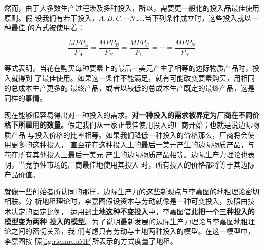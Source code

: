 然而，由于大多数生产过程涉及多种投入，所以，需要更一般化的投入品最佳使用原则。假
设我们有若干投入，$A, B, C , \cdots N$……当下列条件成立时，这些投入就以一种最佳
的方式被使用着：

\[\frac{MPP_A}{P_A} = \frac{MPP_B}{P_B} = \frac{MPP_C}{P_C} = \cdots = \frac{MPP_N}{P_N}\]

等式表明，当花在购买每种要素上的最后一美元产生了相等的边际物质产品时，投入就得到
了最佳使用。如果这一条件不能满足，就有可能改变要素购买，用相同的总成本生产更多的
最终产品，或者以较低的总成本生产既定的最终产品，这是同样的事情。

现在能够很容易得出对一种投入的需求。\textbf{对一种投入的需求被界定为厂商在不同价
  格下所雇用的数量。}假定我们从一家正最佳使用投入的厂商开始；也就是说边际物质产品
与投入价格的比率相等。如果我们降低一种投入的价格那么，厂商将会使用更多的这种投入，
直至花在这种投入上的最后一美元产生的边际物质产品，与花在所有其他投入上最后一美元
产生的边际物质产品相等。边际生产力理论也表明，当竞争性市场的厂商最佳地使用其投入
时，所有投入的价格都将等于其边际产品价值。

就像一些创始者所认同的那样，边际生产力的这些新观点与李嘉图的地租理论密切相联。分
析地租理论时，李嘉图假设资本与劳动就像是一种可变投入，按照由技术决定的固定比例，
运用到\textbf{土地这种不变投入}中，李嘉图借此\textbf{把一个三种投入的模型变为两种
  投入的模型}。为了说明最新发展的边际生产力理论与李嘉图地租理论之间的密切关系，我
们考虑只有劳动与土地两种投入的模型。在这一模型中，李嘉图按
照\cref{fig:richardoMP}所表示的方式度量了地租。

